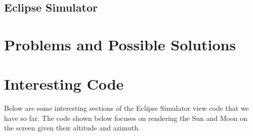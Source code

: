 \documentclass[10pt, onecolumn, draftclsnofoot, letterpaper, compsoc]{IEEEtran}
\begin{document}

\subsection{Eclipse Simulator}


\section{Problems and Possible Solutions}


\section{Interesting Code}

Below are some interesting sections of the Eclipse Simulator view code that we have so far. 
The code shown below focuses on rendering the Sun and Moon on the screen given their
altitude and azimuth. \\
\end{document}

